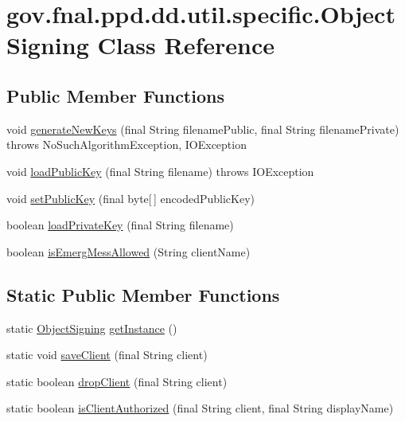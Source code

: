 \hypertarget{classgov_1_1fnal_1_1ppd_1_1dd_1_1util_1_1specific_1_1ObjectSigning}{\section{gov.\-fnal.\-ppd.\-dd.\-util.\-specific.\-Object\-Signing Class Reference}
\label{classgov_1_1fnal_1_1ppd_1_1dd_1_1util_1_1specific_1_1ObjectSigning}
}
\subsection*{Public Member Functions}
\begin{DoxyCompactItemize}
\item 
void \hyperlink{classgov_1_1fnal_1_1ppd_1_1dd_1_1util_1_1specific_1_1ObjectSigning_af0b44b53a18273c1ac9b2965e62c496e}{generate\-New\-Keys} (final String filename\-Public, final String filename\-Private)  throws No\-Such\-Algorithm\-Exception, I\-O\-Exception 
\item 
void \hyperlink{classgov_1_1fnal_1_1ppd_1_1dd_1_1util_1_1specific_1_1ObjectSigning_adb2220ffd868f2c90669a60e103eabfe}{load\-Public\-Key} (final String filename)  throws I\-O\-Exception 
\item 
void \hyperlink{classgov_1_1fnal_1_1ppd_1_1dd_1_1util_1_1specific_1_1ObjectSigning_a28634898ffa14ba174a785f3a40cb1de}{set\-Public\-Key} (final byte\mbox{[}$\,$\mbox{]} encoded\-Public\-Key)
\item 
boolean \hyperlink{classgov_1_1fnal_1_1ppd_1_1dd_1_1util_1_1specific_1_1ObjectSigning_ad05b0cd592f8f25aa296a80928f31cc7}{load\-Private\-Key} (final String filename)
\item 
boolean \hyperlink{classgov_1_1fnal_1_1ppd_1_1dd_1_1util_1_1specific_1_1ObjectSigning_a561eedb67812a4082d737ec182fe288c}{is\-Emerg\-Mess\-Allowed} (String client\-Name)
\end{DoxyCompactItemize}
\subsection*{Static Public Member Functions}
\begin{DoxyCompactItemize}
\item 
static \hyperlink{classgov_1_1fnal_1_1ppd_1_1dd_1_1util_1_1specific_1_1ObjectSigning}{Object\-Signing} \hyperlink{classgov_1_1fnal_1_1ppd_1_1dd_1_1util_1_1specific_1_1ObjectSigning_a905548cd8a28135026ff8cd2e3f09598}{get\-Instance} ()
\item 
static void \hyperlink{classgov_1_1fnal_1_1ppd_1_1dd_1_1util_1_1specific_1_1ObjectSigning_a2c6282d1254482c733c5bdb01ae4fd2b}{save\-Client} (final String client)
\item 
static boolean \hyperlink{classgov_1_1fnal_1_1ppd_1_1dd_1_1util_1_1specific_1_1ObjectSigning_ab51a44acbc4795b78f9b608c361e9369}{drop\-Client} (final String client)
\item 
static boolean \hyperlink{classgov_1_1fnal_1_1ppd_1_1dd_1_1util_1_1specific_1_1ObjectSigning_a462a209a028c4c3f44ab861d0a56ab8f}{is\-Client\-Authorized} (final String client, final String display\-Name)
\end{DoxyCompactItemize}
